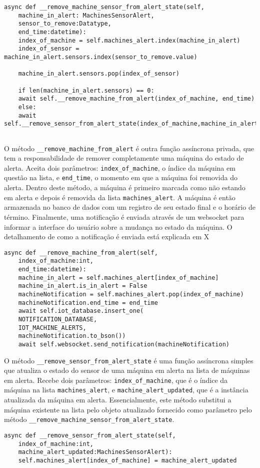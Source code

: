 \begin{verbatim}
async def __remove_machine_sensor_from_alert_state(self,
    machine_in_alert: MachinesSensorAlert,
    sensor_to_remove:Datatype,
    end_time:datetime):
    index_of_machine = self.machines_alert.index(machine_in_alert)
    index_of_sensor = machine_in_alert.sensors.index(sensor_to_remove.value)
    
    machine_in_alert.sensors.pop(index_of_sensor)
    
    if len(machine_in_alert.sensors) == 0:
    await self.__remove_machine_from_alert(index_of_machine, end_time)
    else:
    await self.__remove_sensor_from_alert_state(index_of_machine,machine_in_alert)
    
\end{verbatim}

O método \texttt{\_\_remove\_machine\_from\_alert} é outra função assíncrona privada, que tem a responsabilidade de remover completamente uma máquina do estado de alerta. Aceita dois parâmetros: \texttt{index\_of\_machine}, o índice da máquina em questão na lista, e \texttt{end\_time}, o momento em que a máquina foi removida do alerta. Dentro deste método, a máquina é primeiro marcada como não estando em alerta e depois é removida da lista \texttt{machines\_alert}. A máquina é então armazenada no banco de dados com um registro de seu estado final e o horário de término. Finalmente, uma notificação é enviada através de um websocket para informar a interface do usuário sobre a mudança no estado da máquina. O detalhamento de como a notificação é enviada está explicada em X %

\begin{verbatim}
async def __remove_machine_from_alert(self,
    index_of_machine:int,
    end_time:datetime):
    machine_in_alert = self.machines_alert[index_of_machine]
    machine_in_alert.is_in_alert = False
    machineNotification = self.machines_alert.pop(index_of_machine)
    machineNotification.end_time = end_time
    await self.iot_database.insert_one(
    NOTIFICATION_DATABASE,
    IOT_MACHINE_ALERTS,
    machineNotification.to_bson())
    await self.websocket.send_notification(machineNotification)    
\end{verbatim}

O método \texttt{\_\_remove\_sensor\_from\_alert\_state} é uma função assíncrona simples que atualiza o estado do sensor de uma máquina em alerta na lista de máquinas em alerta. Recebe dois parâmetros: \texttt{index\_of\_machine}, que é o índice da máquina na lista \texttt{machines\_alert}, e \texttt{machine\_alert\_updated}, que é a instância atualizada da máquina em alerta. Essencialmente, este método substitui a máquina existente na lista pelo objeto atualizado fornecido como parâmetro pelo método \texttt{\_\_remove\_machine\_sensor\_from\_alert\_state}.

\begin{verbatim}
async def __remove_sensor_from_alert_state(self,
    index_of_machine:int,
    machine_alert_updated:MachinesSensorAlert):
    self.machines_alert[index_of_machine] = machine_alert_updated
\end{verbatim}
